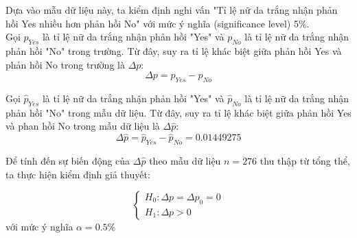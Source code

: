 \documentclass[a4paper,12pt]{article}
\begin{document}
		Dựa vào mẫu dữ liệu này, ta kiểm định nghi vấn "Tỉ lệ nữ da trắng nhận phản hồi Yes nhiều hơn phản hồi No" với mức ý nghĩa (significance level) 5\%.\\
		
		Gọi $p_{Yes}$ là tỉ lệ nữ da trắng nhận phản hồi "Yes" và $p_{No}$ là tỉ lệ nữ da trắng nhận phản hồi "No" trong trường. Từ đây, suy ra tỉ lệ khác biệt giữa phản hồi Yes và phản hồi No trong trường là $\Delta p$: 
		$$\Delta p = p_{Yes} - p_{No}$$
		
		Gọi $\hat{p}_{Yes}$ là tỉ lệ nữ da trắng nhận phản hồi "Yes" và $\hat{p}_{No}$ là tỉ lệ nữ da trắng nhận phản hồi "No" trong mẫu dữ liệu. Từ đây, suy ra tỉ lệ khác biệt giữa phản hồi Yes và phan hồi No trong mẫu dữ liệu là $\Delta\hat{p}$:
		$$\Delta\hat{p} = \hat{p}_{Yes} - \hat{p}_{No} = 0.01449275$$
		
		Để tính đến sự biến động của $\Delta\hat{p}$ theo mẫu dữ liệu $n = 276$ thu thập từ tổng thể, ta thực hiện kiểm định giả thuyết:
		
		\begin{equation*}
		\begin{cases}
		H_0: \Delta p = \Delta p_0 = 0\\
		H_1: \Delta p > 0
		\end{cases}
		\end{equation*}
		với mức ý nghĩa $\alpha = 0.5\%$
		
\end{document}
